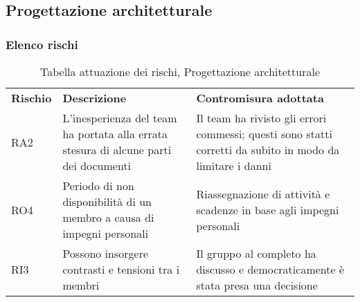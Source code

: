 \newpage
\subsection{Progettazione architetturale}
\subsubsection{Elenco rischi}
\begin{table}[h]
\caption{Tabella attuazione dei rischi, Progettazione architetturale}
\begin{center}
\begin{tabular}{p{2cm}p{6cm}p{6cm}}
\textbf{Rischio} & \textbf{Descrizione}                                                                                                        & \textbf{Contromisura adottata}                                                                                                                                                   \\
RA2              & L'inesperienza del team ha portata alla errata stesura di alcune parti dei documenti & Il team ha rivisto gli errori commessi; questi sono statti corretti da subito in modo da limitare i danni
\\
RO4 & Periodo di non disponibilità di un membro a causa di impegni personali & Riassegnazione di attività e scadenze in base agli impegni personali
\\
RI3 & Possono insorgere contrasti e tensioni tra i membri & Il gruppo al completo ha discusso e democraticamente è stata presa una decisione
\end{tabular}
\end{center}
\end{table}